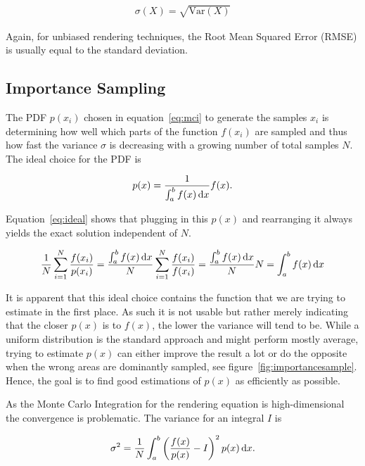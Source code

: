 \begin{align}
 \sigma(X) = \sqrt{\text{Var}(X)}
\end{align}

Again, for unbiased rendering techniques, the Root Mean Squared Error (RMSE) is usually equal to the standard deviation.

\subsection{Importance Sampling}
\label{sec:IS}

The PDF $p(x_i)$ chosen in equation~\ref{eq:mci} to generate the samples $x_i$ is determining how well which parts of the function $f(x_i)$ are sampled and thus how fast the variance $\sigma$ is decreasing with a growing number of total samples $N$. The ideal choice for the PDF is 

\begin{align}
 p(x) = \frac{1}{\int_a^b f(x) \mathop{}\!\mathrm{d} x} f(x).
\end{align}

Equation~\ref{eq:ideal} shows that plugging in this $p(x)$ and rearranging it always yields the exact solution independent of $N$.

\begin{align}
 \label{eq:ideal}
 \frac{1}{N} \sum_{i=1}^{N} \frac{f(x_i)}{p(x_i)} = \frac{\int_a^b f(x) \mathop{}\!\mathrm{d} x}{N} \sum_{i=1}^N \frac{f(x_i)}{f(x_i)} = \frac{\int_a^b f(x) \mathop{}\!\mathrm{d} x}{N} N = \int_a^b f(x) \mathop{}\!\mathrm{d} x
\end{align}

It is apparent that this ideal choice contains the function that we are trying to estimate in the first place. As such it is not usable but rather merely indicating that the closer $p(x)$ is to $f(x)$, the lower the variance will tend to be. While a uniform distribution is the standard approach and might perform mostly average, trying to estimate $p(x)$ can either improve the result a lot or do the opposite when the wrong areas are dominantly sampled, see figure~\ref{fig:importancesample}. Hence, the goal is to find good estimations of $p(x)$ as efficiently as possible.

As the Monte Carlo Integration for the rendering equation is high-dimensional the convergence is problematic. The variance for an integral $I$ is

\begin{align}
 \sigma^2 = \frac{1}{N} \int_a^b \left( \frac{f(x)}{p(x)} - I \right)^2 p(x) \mathop{}\!\mathrm{d} x.
\end{align}

